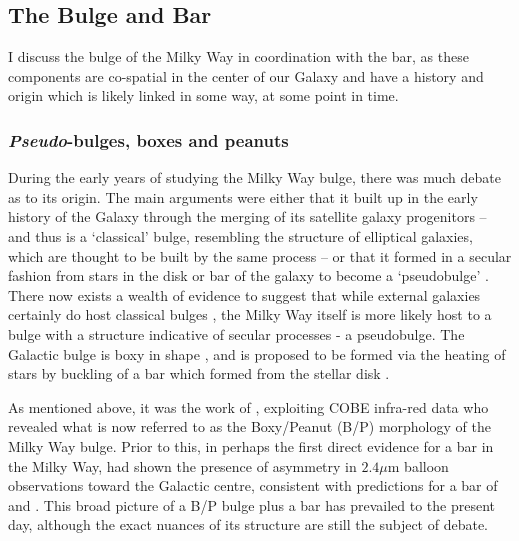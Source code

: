 \subsection{The Bulge and Bar}

I discuss the bulge of the Milky Way in coordination with the bar, as these components are co-spatial in the center of our Galaxy and have a history and origin which is likely linked in some way, at some point in time.

\subsubsection{\emph{Pseudo}-bulges, boxes and peanuts}
During the early years of studying the Milky Way bulge, there was much debate as to its origin. The main arguments were either that it built up in the early history of the Galaxy through the merging of its satellite galaxy progenitors -- and thus is a `classical' bulge, resembling the structure of elliptical galaxies, which are thought to be built by the same process -- or that it formed in a secular fashion from stars in the disk or bar of the galaxy to become a `pseudobulge' \citep[a useful summary of these definitions is provided in Section 1.1 of][]{2004ARA&A..42..603K}. There now exists a wealth of evidence to suggest that while external galaxies certainly do host classical bulges \citep[e.g.][]{2009MNRAS.393.1531G}, the Milky Way itself is more likely host to a bulge with a structure indicative of secular processes - a pseudobulge. The Galactic bulge is boxy in shape \citep[e.g][]{1995ApJ...445..716D}, and is proposed to be formed via the heating of stars by buckling of a bar which formed from the stellar disk \citep[e.g.][]{1981A&A....96..164C,1991Natur.352..411R}.

As mentioned above, it was the work of \citet{1995ApJ...445..716D}, exploiting COBE infra-red data who revealed what is now referred to as the Boxy/Peanut (B/P) morphology of the Milky Way bulge. Prior to this, in perhaps the first direct evidence for a bar in the Milky Way, \citet{1991ApJ...379..631B} had shown the presence of asymmetry in $2.4 \mu$m balloon observations \citep{1982AIPC...83...48M} toward the Galactic centre, consistent with predictions for a bar of \citet{1979A&AS...37..403S} and \citet{1980ApJ...236..779L}. This broad picture of a B/P bulge plus a bar has prevailed to the present day, although the exact nuances of its structure are still the subject of debate.

